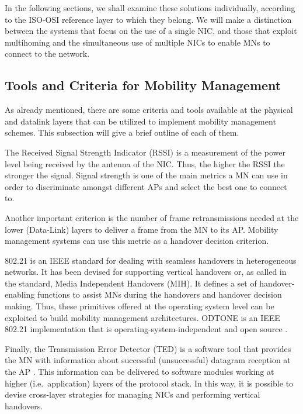 \documentclass[preprint,12pt]{elsarticle}
\begin{document}
In the following sections, we shall examine these solutions individually, 
according to the ISO-OSI reference layer to which they belong. We will make a 
distinction between the systems that focus on the use of a single NIC, and 
those that exploit multihoming and the simultaneous use of multiple NICs to enable MNs 
to connect to the network.

\subsection{Tools and Criteria for Mobility Management}\label{sec:tool_low_levels}

As already mentioned, there are some criteria and tools available at the 
physical and datalink layers that can be utilized to implement mobility 
management schemes. This subsection will give a brief outline of each of them.

The Received Signal Strength Indicator (RSSI) is a measurement of 
the power level being received by the antenna of the NIC. Thus, the higher the 
RSSI the stronger the signal. Signal strength is one of the main metrics a MN can 
use in order to discriminate amongst different APs and select the best one to 
connect to.

Another important criterion is the number of frame retransmissions needed at the lower (Data-Link) layers 
to deliver a frame from the MN to its AP. Mobility management systems can use this metric as a handover decision criterion.

802.21 is an IEEE standard for dealing with seamless handovers in heterogeneous 
networks. It has been devised for supporting vertical handovers or, as 
called in the standard, Media Independent Handovers (MIH).
It defines a set of handover-enabling functions to assist MNs during the 
handovers and handover decision making. Thus, these primitives offered at the operating system level can be exploited to build mobility management architectures.
ODTONE is an IEEE 802.21 implementation that is operating-system-independent and open source \cite{802.21imp}.

Finally, the Transmission Error Detector (TED) is a software tool that provides 
the MN with information about successful (unsuccessful) datagram reception 
at the AP \cite{GhiniJSS}. 
This information can be delivered to software modules working at higher 
(i.e.~application) layers of the protocol stack. In this way, it is possible to 
devise cross-layer strategies for managing NICs and performing vertical 
handovers.
\end{document}

